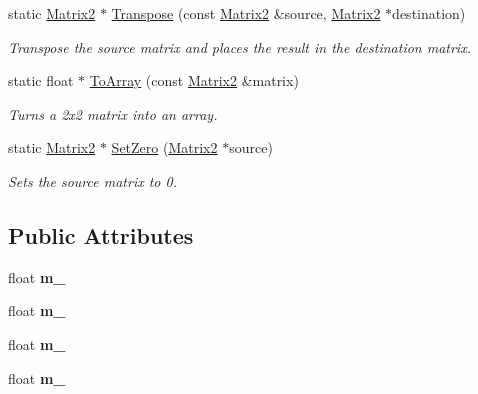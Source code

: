 \begin{DoxyCompactItemize}
static \hyperlink{class_flounder_1_1_matrix2}{Matrix2} $\ast$ \hyperlink{class_flounder_1_1_matrix2_adbab6eda564db723a8c6f27079a92abb}{Transpose} (const \hyperlink{class_flounder_1_1_matrix2}{Matrix2} \&source, \hyperlink{class_flounder_1_1_matrix2}{Matrix2} $\ast$destination)
\begin{DoxyCompactList}\small\item\em Transpose the source matrix and places the result in the destination matrix. \end{DoxyCompactList}\item 
static float $\ast$ \hyperlink{class_flounder_1_1_matrix2_a526a6ff091147588749fe124b871a353}{To\+Array} (const \hyperlink{class_flounder_1_1_matrix2}{Matrix2} \&matrix)
\begin{DoxyCompactList}\small\item\em Turns a 2x2 matrix into an array. \end{DoxyCompactList}\item 
static \hyperlink{class_flounder_1_1_matrix2}{Matrix2} $\ast$ \hyperlink{class_flounder_1_1_matrix2_a0f5b40d999508bb6466de9fd689d252a}{Set\+Zero} (\hyperlink{class_flounder_1_1_matrix2}{Matrix2} $\ast$source)
\begin{DoxyCompactList}\small\item\em Sets the source matrix to 0. \end{DoxyCompactList}\end{DoxyCompactItemize}
\subsection*{Public Attributes}
\begin{DoxyCompactItemize}
\item 
\mbox{\label{class_flounder_1_1_matrix2_af1ed8f4d2cebb6e99660c0e0833387c2}} 
float {\bfseries m\+\_}
\item 
\mbox{\label{class_flounder_1_1_matrix2_af6fd323ff9b58df310274bbbc3f17dcb}} 
float {\bfseries m\+\_}
\item 
\mbox{\label{class_flounder_1_1_matrix2_a4de9030be5f02c289d95b7c0d5b4900e}} 
float {\bfseries m\+\_}
\item 
\mbox{\label{class_flounder_1_1_matrix2_a57af1fcafe4bf777b7b526428bda7466}} 
float {\bfseries m\+\_}
\end{DoxyCompactItemize}


